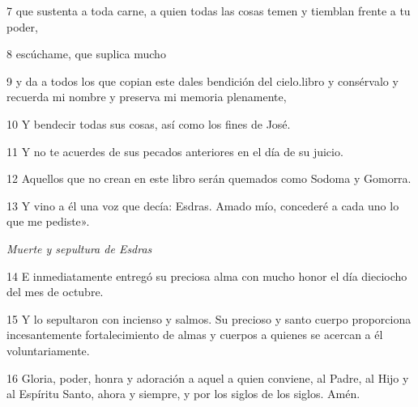 \par 7 que sustenta a toda carne, a quien todas las cosas temen y tiemblan frente a tu poder,

\par 8 escúchame, que suplica mucho 

\par 9 y da a todos los que copian este  dales bendición del cielo.libro y consérvalo y recuerda mi nombre y preserva mi memoria plenamente,

\par 10 Y bendecir todas sus cosas, así como los fines de José.

\par 11 Y no te acuerdes de sus pecados anteriores en el día de su juicio. 

\par 12 Aquellos que no crean en este libro serán quemados como Sodoma y Gomorra.

\par 13 Y vino a él una voz que decía: Esdras. Amado mío, concederé a cada uno lo que me pediste».

\par \textit{Muerte y sepultura de Esdras}

\par 14 E inmediatamente entregó su preciosa alma con mucho honor el día dieciocho del mes de octubre.

\par 15 Y lo sepultaron con incienso y salmos. Su precioso y santo cuerpo proporciona incesantemente fortalecimiento de almas y cuerpos a quienes se acercan a él voluntariamente.

\par 16 Gloria, poder, honra y adoración a aquel a quien conviene, al Padre, al Hijo y al Espíritu Santo, ahora y siempre, y por los siglos de los siglos. Amén.

